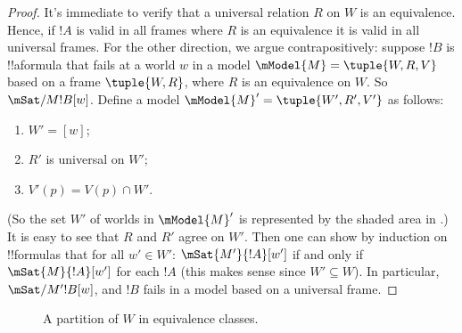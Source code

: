 \documentclass[../../../include/open-logic-section]{subfiles}
\begin{document}
\begin{proof}
  It's immediate to verify that a universal relation $R$ on $W$ is an
  equivalence. Hence, if $!A$ is valid in all frames where $R$ is an
  equivalence it is valid in all universal frames. For the other
  direction, we argue contrapositively: suppose $!B$ is !!a{formula}
  that fails at a world $w$ in a model $\mModel{M} = \tuple{W, R, V}$
  based on a frame $\tuple{W,R}$, where $R$ is an equivalence on
  $W$. So $\mSat/{M}{!B}[w]$. Define a model $\mModel{M}' = \tuple{W',
    R', V'}$ as follows:
  \begin{enumerate}
  \item $W' = [w]$;
  \item $R'$ is universal on $W'$;
  \item $V'(p) = V(p) \cap W'$. 
  \end{enumerate}
  (So the set $W'$ of worlds in $\mModel{M}'$ is represented by the
  shaded area in .)  It is easy to see
  that $R$ and $R'$ agree on $W'$. Then one can show by induction on
  !!{formula}s that for all $w' \in W'$: $\mSat{M'}{!A}[w']$ if and
  only if $\mSat{M}{!A}[w']$ for each $!A$ (this makes sense since $W'
  \subseteq W$). In particular, $\mSat/{M'}{!B}[w]$, and $!B$ fails in
  a model based on a universal frame.
\end{proof}

\begin{figure}[t]
  \centering
  \caption{A partition of $W$ in equivalence classes.}
\end{figure}
\end{document}
